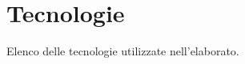\section{Tecnologie}\label{sec:Tecnologie}

Elenco delle tecnologie utilizzate nell'elaborato.

\newpage